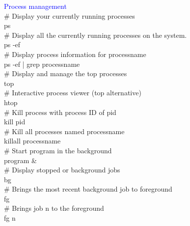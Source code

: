 \documentclass{article}
\begin{document}
\textcolor{blue}{Process management }\\
\noindent
\# Display your currently running processes\\
ps\\
\# Display all the currently running processes on the system.\\
ps -ef\\
\# Display process information for processname\\
ps -ef | grep processname\\
\# Display and manage the top processes\\
top\\
\# Interactive process viewer (top alternative)\\
htop\\
\# Kill process with process ID of pid\\
kill pid\\
\# Kill all processes named processname\\
killall processname\\
\# Start program in the background\\
program &\\
\# Display stopped or background jobs\\
bg\\
\# Brings the most recent background job to foreground\\
fg\\
\# Brings job n to the foreground\\
fg n\\
\end{document}
